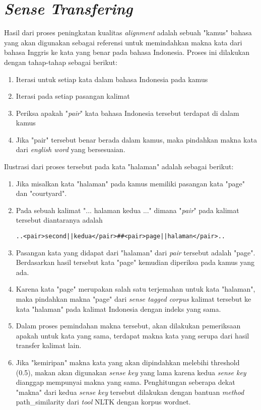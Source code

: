 \section{\textit{Sense Transfering}}
Hasil dari proses peningkatan kualitas \textit{alignment} adalah sebuah "kamus" bahasa yang akan digunakan sebagai referensi untuk memindahkan makna kata dari bahasa Inggris ke kata yang benar pada bahasa Indonesia. Proses ini dilakukan dengan tahap-tahap sebagai berikut:

\begin{enumerate}
	\item Iterasi untuk setiap kata dalam bahasa Indonesia pada kamus
	\item Iterasi pada setiap pasangan kalimat
	\item Periksa apakah "\textit{pair}" kata bahasa Indonesia tersebut terdapat di dalam kamus
	\item Jika "pair" tersebut benar berada dalam kamus, maka pindahkan makna kata dari \textit{english word} yang bersesuaian.
\end{enumerate}

Ilustrasi dari proses tersebut pada kata "halaman" adalah sebagai berikut:

\begin{enumerate}
	\item Jika misalkan kata "halaman" pada kamus memiliki pasangan kata "page" dan "courtyard".
	\item Pada sebuah kalimat "... halaman kedua ..." dimana "\textit{pair}" pada kalimat tersebut diantaranya adalah
	\begin{lstlisting}[backgroundcolor = \color{white}]
	..<pair>second||kedua</pair>##<pair>page||halaman</pair>..
	\end{lstlisting}
	\item Pasangan kata yang didapat dari "halaman" dari \textit{pair} tersebut adalah "page". Berdasarkan hasil tersebut kata "page" kemudian diperiksa pada kamus yang ada.
	\item Karena kata "page" merupakan salah satu terjemahan untuk kata "halaman", maka pindahkan makna "page" dari \textit{sense tagged corpus} kalimat tersebut ke kata "halaman" pada kalimat Indonesia dengan indeks yang sama.
	\item Dalam proses pemindahan makna tersebut, akan dilakukan pemeriksaan apakah untuk kata yang sama, terdapat makna kata yang serupa dari hasil transfer kalimat lain.
	\item Jika "kemiripan" makna kata yang akan dipindahkan melebihi threshold (0.5), makan akan digunakan \textit{sense key} yang lama karena kedua \textit{sense key} dianggap mempunyai makna yang sama. Penghitungan seberapa dekat "makna" dari kedua \textit{sense key} tersebut dilakukan dengan bantuan \textit{method} path\_similarity dari \textit{tool} NLTK dengan korpus wordnet.
\end{enumerate}

